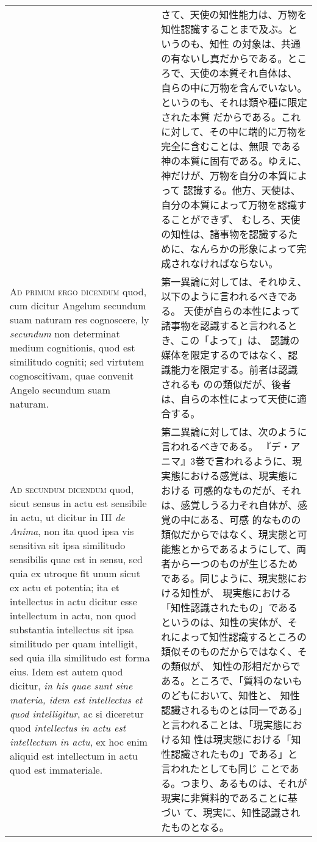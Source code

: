 \documentclass[10pt]{jsarticle} %
\begin{document}
\begin{longtable}{p{21em}p{21em}}
&

さて、天使の知性能力は、万物を知性認識することまで及ぶ。というのも、知性
 の対象は、共通の有ないし真だからである。ところで、天使の本質それ自体は、
 自らの中に万物を含んでいない。というのも、それは類や種に限定された本質
 だからである。これに対して、その中に端的に万物を完全に含むことは、無限
 である神の本質に固有である。ゆえに、神だけが、万物を自分の本質によって
 認識する。他方、天使は、自分の本質によって万物を認識することができず、
 むしろ、天使の知性は、諸事物を認識するために、なんらかの形象によって完
 成されなければならない。

\\


{\scshape Ad primum ergo dicendum} quod, cum dicitur Angelum secundum
suam naturam res cognoscere, ly {\itshape secundum} non determinat medium
cognitionis, quod est similitudo cogniti; sed virtutem cognoscitivam,
quae convenit Angelo secundum suam naturam.

&

第一異論に対しては、それゆえ、以下のように言われるべきである。
天使が自らの本性によって諸事物を認識すると言われるとき、この「よって」は、
 認識の媒体を限定するのではなく、認識能力を限定する。前者は認識されるも
 のの類似だが、後者は、自らの本性によって天使に適合する。

\\


{\scshape Ad secundum dicendum} quod, sicut sensus in actu est sensibile
in actu, ut dicitur in III {\itshape de Anima}, non ita quod ipsa vis sensitiva sit
ipsa similitudo sensibilis quae est in sensu, sed quia ex utroque fit
unum sicut ex actu et potentia; ita et intellectus in actu dicitur esse
intellectum in actu, non quod substantia intellectus sit ipsa similitudo
per quam intelligit, sed quia illa similitudo est forma eius. Idem est
autem quod dicitur, {\itshape in his quae sunt sine materia, idem est intellectus
et quod intelligitur}, ac si diceretur quod {\itshape intellectus in actu est
intellectum in actu}, ex hoc enim aliquid est intellectum in actu quod
est immateriale.

&

第二異論に対しては、次のように言われるべきである。
『デ・アニマ』3巻で言われるように、現実態における感覚は、現実態における
 可感的なものだが、それは、感覚しうる力それ自体が、感覚の中にある、可感
 的なものの類似だからではなく、現実態と可能態とからであるようにして、両
 者から一つのものが生じるためである。同じように、現実態における知性が、
 現実態における「知性認識されたもの」であるというのは、知性の実体が、そ
 れによって知性認識するところの類似そのものだからではなく、その類似が、
 知性の形相だからである。ところで、「質料のないものどもにおいて、知性と、
 知性認識されるものとは同一である」と言われることは、「現実態における知
 性は現実態における「知性認識されたもの」である」と言われたとしても同じ
 ことである。つまり、あるものは、それが現実に非質料的であることに基づい
 て、現実に、知性認識されたものとなる。


\end{longtable}
\end{document}
